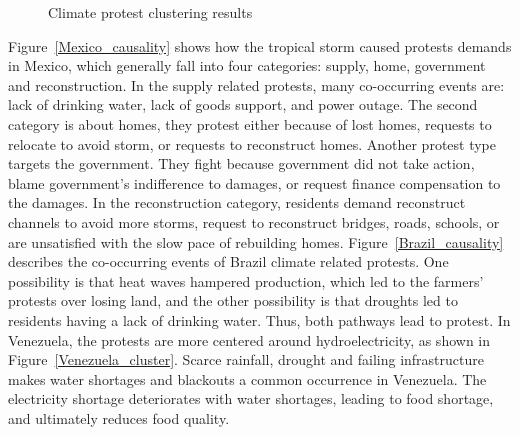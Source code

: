 \documentclass[9pt,twocolumn,twoside]{pnas-new}
\begin{document}
\begin{figure}[t]
	\centering
	\caption{Climate protest clustering results}
\label{clusters}
\end{figure}

Figure~\ref{Mexico_causality} shows how the tropical storm caused protests demands in Mexico, which generally fall into four categories: supply, home, government and reconstruction. In the supply related protests, many co-occurring events are: lack of drinking water, lack of goods support, and power outage. The second category is about homes, they protest either because of lost homes, requests to relocate to avoid storm, or requests to reconstruct homes. Another protest type targets the government.
They fight because government did not take action, blame government's indifference to damages, or request finance compensation to the damages.
In the reconstruction category, residents demand reconstruct channels to avoid more storms, request to reconstruct bridges, roads, schools, or are unsatisfied with the slow pace of rebuilding homes. Figure~\ref{Brazil_causality} describes the co-occurring events of Brazil climate related protests. One possibility is that heat waves hampered production, which led to the farmers' protests over losing land, and the other possibility is that droughts led to residents having a lack of drinking water.
Thus, both pathways lead to protest.
In Venezuela, the protests are more centered around hydroelectricity, as shown in Figure~\ref{Venezuela_cluster}. Scarce rainfall, drought and failing infrastructure makes water shortages and blackouts a common occurrence in Venezuela. The electricity shortage deteriorates with water shortages, leading to food shortage, and ultimately reduces food quality.
\end{document}
